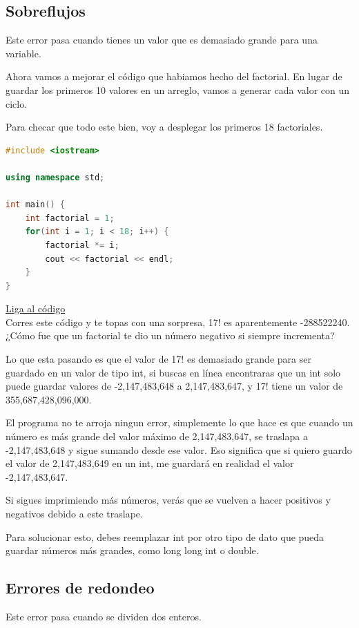 \documentclass{article}
\begin{document}
\subsection{Sobreflujos}
Este error pasa cuando tienes un valor que es demasiado grande para una variable.

Ahora vamos a mejorar el código que habiamos hecho del factorial. En lugar de guardar los primeros 10 valores en un arreglo, vamos a generar cada valor con un ciclo.

Para checar que todo este bien, voy a desplegar los primeros 18 factoriales.

\begin{lstlisting}[language=C++, title=Sobreflujo]
#include <iostream>

using namespace std;

int main() {
	int factorial = 1;
	for(int i = 1; i < 18; i++) {
		factorial *= i;
		cout << factorial << endl;
	}
}
\end{lstlisting}
\href{https://repl.it/@Jamesscn/Sobrefactorial}{Liga al código}\\

Corres este código y te topas con una sorpresa, 17! es aparentemente -288522240. ¿Cómo fue que un factorial te dio un número negativo si siempre incrementa?

Lo que esta pasando es que el valor de 17! es demasiado grande para ser guardado en un valor de tipo int, si buscas en línea encontraras que un int solo puede guardar valores de -2,147,483,648 a 2,147,483,647, y 17! tiene un valor de 355,687,428,096,000.

El programa no te arroja ningun error, simplemente lo que hace es que cuando un número es más grande del valor máximo de 2,147,483,647, se traslapa a -2,147,483,648 y sigue sumando desde ese valor. Eso significa que si quiero guardo el valor de 2,147,483,649 en un int, me guardará en realidad el valor -2,147,483,647.

Si sigues imprimiendo más números, verás que se vuelven a hacer positivos y negativos debido a este traslape.

Para solucionar esto, debes reemplazar int por otro tipo de dato que pueda guardar números más grandes, como long long int o double.

\subsection{Errores de redondeo}
Este error pasa cuando se dividen dos enteros.
\end{document}
